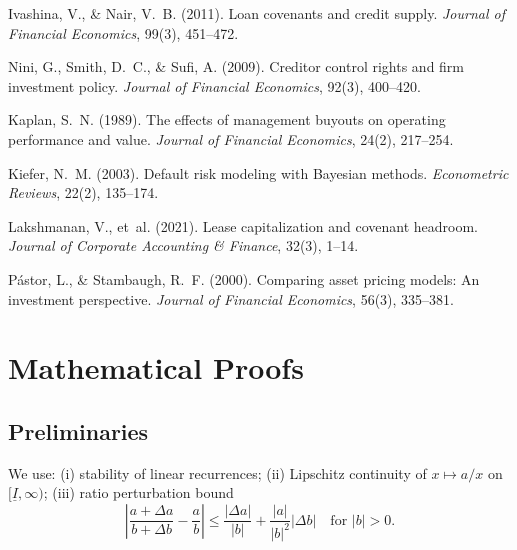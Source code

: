 \documentclass[11pt,a4paper]{article}
\theoremstyle{plain}
\theoremstyle{definition}
\begin{document}
\begin{thebibliography}{99}
Ivashina, V., \& Nair, V.~B. (2011).
\newblock Loan covenants and credit supply.
\newblock \emph{Journal of Financial Economics}, 99(3), 451--472.

Nini, G., Smith, D.~C., \& Sufi, A. (2009).
\newblock Creditor control rights and firm investment policy.
\newblock \emph{Journal of Financial Economics}, 92(3), 400--420.

Kaplan, S.~N. (1989).
\newblock The effects of management buyouts on operating performance and value.
\newblock \emph{Journal of Financial Economics}, 24(2), 217--254.

Kiefer, N.~M. (2003).
\newblock Default risk modeling with Bayesian methods.
\newblock \emph{Econometric Reviews}, 22(2), 135--174.

Lakshmanan, V., et~al. (2021).
\newblock Lease capitalization and covenant headroom.
\newblock \emph{Journal of Corporate Accounting \& Finance}, 32(3), 1--14.

P{\'a}stor, L., \& Stambaugh, R.~F. (2000).
\newblock Comparing asset pricing models: An investment perspective.
\newblock \emph{Journal of Financial Economics}, 56(3), 335--381.

\end{thebibliography}

\newpage
\appendix

\section{Mathematical Proofs}
\label{app:proofs}
\subsection*{Preliminaries}
We use: (i) stability of linear recurrences; (ii) Lipschitz continuity of $x\mapsto a/x$ on $[\underline{I},\infty)$; (iii) ratio perturbation bound
\begin{equation}
\left|\frac{a+\Delta a}{b+\Delta b}-\frac{a}{b}\right| \le \frac{|\Delta a|}{|b|} + \frac{|a|}{|b|^2}|\Delta b| \quad \text{for } |b|>0.
\end{equation}
\end{document}
